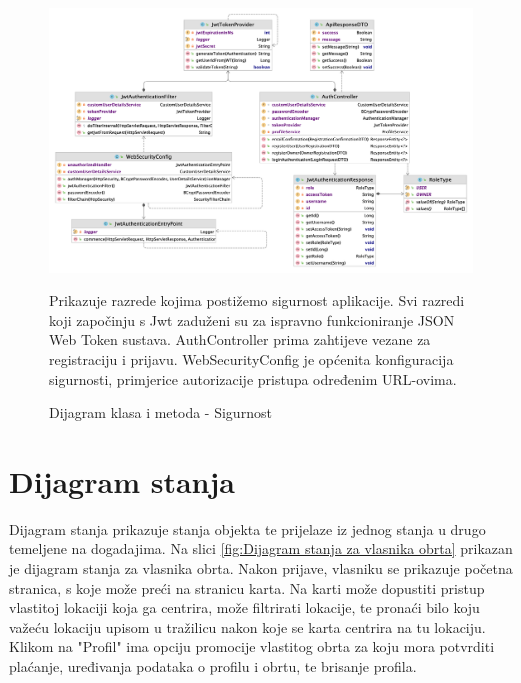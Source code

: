             \begin{figure}[H]
                \includegraphics[width=\textwidth]{slike/DR-security.png} %
                \caption{Dijagram klasa i metoda - Sigurnost}
                {\small Prikazuje razrede kojima postižemo sigurnost aplikacije. Svi razredi koji započinju s Jwt zaduženi su za ispravno funkcioniranje JSON Web Token sustava. AuthController prima zahtijeve vezane za registraciju i prijavu. WebSecurityConfig je općenita konfiguracija sigurnosti, primjerice autorizacije pristupa određenim URL-ovima.}
                \label{fig:Security} %
		    \end{figure}
		
        \newpage
		\section{Dijagram stanja}
			Dijagram stanja prikazuje stanja objekta te prijelaze iz jednog stanja u drugo temeljene
            na dogadajima. Na slici \ref{fig:Dijagram stanja za vlasnika obrta} prikazan je dijagram stanja za vlasnika obrta. Nakon prijave, vlasniku se prikazuje početna stranica, s koje može preći na stranicu karta.
            Na karti može dopustiti pristup vlastitoj lokaciji koja ga centrira, može filtrirati lokacije, te pronaći bilo
            koju važeću lokaciju upisom u tražilicu nakon koje se karta centrira na tu lokaciju.
            Klikom na "Profil" ima opciju promocije vlastitog obrta za koju mora potvrditi plaćanje,
            uređivanja podataka o profilu i obrtu, te brisanje profila.

